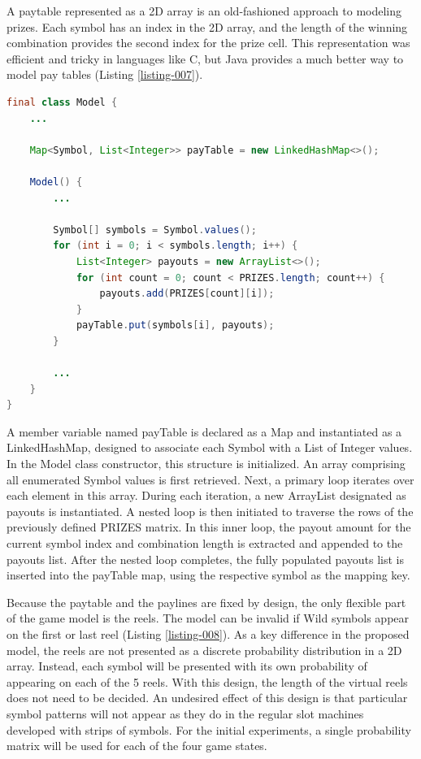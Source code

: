 \documentclass[12pt,twoside,openany]{book}
\begin{document}
A paytable represented as a 2D array is an old-fashioned approach to modeling prizes. Each symbol has an index in the 2D array, and the length of the winning combination provides the second index for the prize cell. This representation was efficient and tricky in languages like C, but Java provides a much better way to model pay tables (Listing \ref{listing-007}).

\begin{lstlisting}[language=Java, caption={Efficient paytable representation}, label=listing-007]
final class Model {
	...

	Map<Symbol, List<Integer>> payTable = new LinkedHashMap<>();

	Model() {
		...

		Symbol[] symbols = Symbol.values();
		for (int i = 0; i < symbols.length; i++) {
			List<Integer> payouts = new ArrayList<>();
			for (int count = 0; count < PRIZES.length; count++) {
				payouts.add(PRIZES[count][i]);
			}
			payTable.put(symbols[i], payouts);
		}

		...
	}
}
\end{lstlisting}

A member variable named payTable is declared as a Map and instantiated as a LinkedHashMap, designed to associate each Symbol with a List of Integer values. In the Model class constructor, this structure is initialized. An array comprising all enumerated Symbol values is first retrieved. Next, a primary loop iterates over each element in this array. During each iteration, a new ArrayList designated as payouts is instantiated. A nested loop is then initiated to traverse the rows of the previously defined PRIZES matrix. In this inner loop, the payout amount for the current symbol index and combination length is extracted and appended to the payouts list. After the nested loop completes, the fully populated payouts list is inserted into the payTable map, using the respective symbol as the mapping key.

Because the paytable and the paylines are fixed by design, the only flexible part of the game model is the reels. The model can be invalid if Wild symbols appear on the first or last reel (Listing \ref{listing-008}). As a key difference in the proposed model, the reels are not presented as a discrete probability distribution in a 2D array. Instead, each symbol will be presented with its own probability of appearing on each of the 5 reels. With this design, the length of the virtual reels does not need to be decided. An undesired effect of this design is that particular symbol patterns will not appear as they do in the regular slot machines developed with strips of symbols. For the initial experiments, a single probability matrix will be used for each of the four game states.
\end{document}
